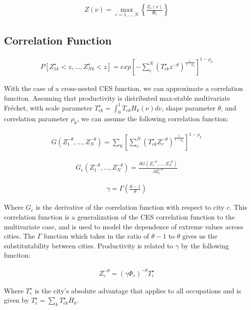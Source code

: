 \documentclass[10pt]{article}
\begin{document}
\begin{align}
    Z(\nu) = \max_{c = 1, \dots, N} \left\{\frac{Z_c(\nu)}{\Phi_c}\right\}
\end{align}

\subsection{Correlation Function}

\begin{align}
    P[Z_{1k}^{\star} < z, \dots, Z_{Nk}^{\star} < z] = exp[-\sum_{c}^{N}(T_{ck}^{\star} z^{-\theta})^{\frac{1}{1 - \rho_k}}]^{1 - \rho_k}
\end{align}

With the case of a cross-nested CES function, we can approximate a correlation funciton. Assuming that productivity is distributed max-stable multivariate Fréchet, with scale parameter $T_{ck}^{\star} = \int_{0}^{1} T_{ck} H_k(\nu) dv$, shape parameter $\theta$, and correlation parameter $\rho_k$, we can assume the following correlation function:

\begin{align}
    G (Z_1^{-\theta}, \dots, Z_N^{-\theta})= \sum_{k}^{} [\sum_{c}^{N} (T_{ck}^{\star} Z_c^{-\theta})^{\frac{1}{1 - \rho_k}}]^{1 - \rho_k}
\end{align}

\begin{align}
    G_c (Z_1^{-\theta}, \dots, Z_N^{-\theta}) = \frac{\partial G (Z_1^{-\theta}, \dots, Z_N^{-\theta})}{\partial Z_c^{-\theta}}
\end{align}

\begin{align}
    \gamma = \Gamma (\frac{\theta - 1}{\theta})
\end{align}

Where $G_c$ is the derivative of the correlation function with respect to city $c$. This correlation function is a generalization of the CES correlation function to the multivariate case, and is used to model the dependence of extreme values across cities. The $\Gamma$ function which takes in the ratio of $\theta - 1$ to $\theta$ gives us the substitutability between cities. Productivity is related to $\gamma$ by the following funciton:

\begin{align}
    Z_c^{-\theta} = (\gamma \Phi_c)^{-\theta} T_c^{\star}
\end{align}

Where $T_c^{\star}$ is the city's absolute advantage that applies to all occupations and is given by $T_c^{\star} = \sum_{k}^{} T_{ck}^{\star} H_k$.
\end{document}
